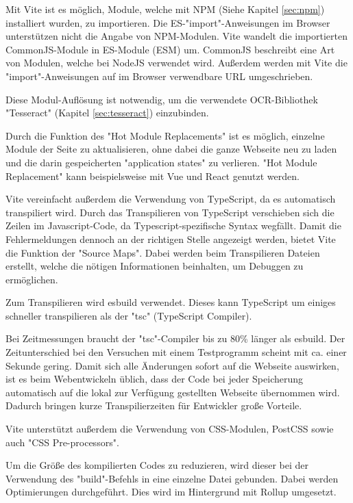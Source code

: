 

Mit Vite ist es möglich, Module, welche mit NPM (Siehe Kapitel \ref{sec:npm}) installiert wurden, zu importieren. 
Die ES-"import"-Anweisungen im Browser unterstützen nicht die Angabe von NPM-Modulen. Vite wandelt die importierten CommonJS-Module in ES-Module (ESM) um. CommonJS beschreibt eine Art von Modulen, welche bei NodeJS verwendet wird. Außerdem werden mit Vite die "import"-Anweisungen auf im Browser verwendbare URL umgeschrieben. \cite{ViteFeatures}


Diese Modul-Auflösung ist notwendig, um die verwendete OCR-Bibliothek "Tesseract" (Kapitel \ref{sec:tesseract}) einzubinden. 


Durch die Funktion des "Hot Module Replacements" ist es möglich, einzelne Module der Seite zu aktualisieren, ohne dabei die ganze Webseite neu zu laden und die darin gespeicherten "application states" zu verlieren. "Hot Module Replacement" kann beispielsweise mit Vue und React genutzt werden. \cite{ViteFeatures}
  

Vite vereinfacht außerdem die Verwendung von TypeScript, da es automatisch transpiliert wird. 
Durch das Transpilieren von TypeScript verschieben sich die Zeilen im Javascript-Code, da Typescript-spezifische Syntax wegfällt. 
Damit die Fehlermeldungen dennoch an der richtigen Stelle angezeigt werden, bietet Vite die Funktion der "Source Maps". 
Dabei werden beim Transpilieren Dateien erstellt, welche die nötigen Informationen beinhalten, um Debuggen zu ermöglichen.

Zum Transpilieren wird esbuild\cite{esbuild} verwendet. Dieses kann TypeScript um einiges schneller transpilieren als der "tsc" (TypeScript Compiler). \cite{ViteFeatures}

Bei Zeitmessungen braucht der "tsc"-Compiler bis zu 80\% länger als esbuild. Der Zeitunterschied bei den Versuchen mit einem Testprogramm scheint mit ca. einer Sekunde gering. Damit sich alle Änderungen sofort auf die Webseite auswirken, ist es beim Web\-entwickeln üblich, dass der Code bei jeder Speicherung automatisch auf die lokal zur Verfügung gestellten Webseite übernommen wird. Dadurch bringen kurze Transpilierzeiten für Entwickler große Vorteile. 


Vite unterstützt außerdem die Verwendung von CSS-Modulen, PostCSS sowie auch "CSS Pre-processors". \cite{ViteFeatures}


Um die Größe des kompilierten Codes zu reduzieren, wird dieser bei der Verwendung des "build"-Befehls in eine einzelne Datei gebunden. Dabei werden Optimierungen durchgeführt. Dies wird im Hintergrund mit Rollup \cite{Rollup} umgesetzt. 


    
    

